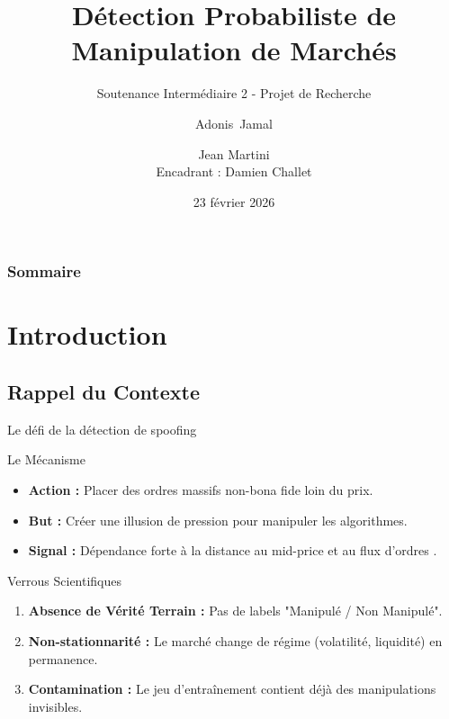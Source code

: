 \documentclass{beamer}
\title[Détection de Manipulation]{Détection Probabiliste de Manipulation de Marchés}
\subtitle{Soutenance Intermédiaire 2 - Projet de Recherche}
\author[Jamal, Martini]{Adonis~Jamal \and Jean Martini\\Encadrant : Damien Challet}
\institute[CentraleSupélec]{CentraleSupélec -- Laboratoire MICS}
\date[23 février 2026]{23 février 2026}
\begin{document}
\frame{\titlepage}

\begin{frame}
    \frametitle{Sommaire}
    \tableofcontents
\end{frame}

\section{Introduction}
\subsection{Rappel du Contexte}
\begin{frame}{Le défi de la détection de spoofing}
    \begin{block}{Le Mécanisme}
        \begin{itemize}
            \item \textbf{Action :} Placer des ordres massifs non-bona fide loin du prix.
            \item \textbf{But :} Créer une illusion de pression pour manipuler les algorithmes.
            \item \textbf{Signal :} Dépendance forte à la distance au mid-price et au flux d'ordres \cite{tao_2020}.
        \end{itemize}
    \end{block}
    \begin{alertblock}{Verrous Scientifiques}
        \begin{enumerate}
            \item \textbf{Absence de Vérité Terrain :} Pas de labels "Manipulé / Non Manipulé".
            \item \textbf{Non-stationnarité :} Le marché change de régime (volatilité, liquidité) en permanence.
            \item \textbf{Contamination :} Le jeu d'entraînement contient déjà des manipulations invisibles.
        \end{enumerate}
    \end{alertblock}
\end{frame}
\end{document}
